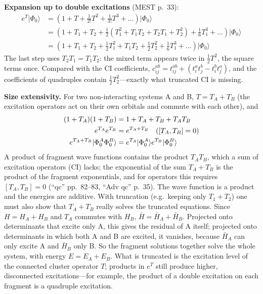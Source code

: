 \textbf{Expansion up to double excitations} (MEST p.~33):
\begin{align*}
e^{T} |\Phi_0\rangle &= \left(1 + T + \frac{1}{2!} T^2 + \frac{1}{3!} T^3 + \dots\right) |\Phi_0\rangle \\
&= \left(1 + T_1 + T_2 + \frac{1}{2} (T_1^2 + T_1 T_2 + T_2 T_1 + T_2^2) + \frac{1}{6} T_1^3 + \dots\right) |\Phi_0\rangle \\
&= \left(1 + T_1 + T_2 + \frac{1}{2} T_1^2 + T_1 T_2 + \frac{1}{2} T_2^2 + \frac{1}{6} T_1^3 + \dots\right) |\Phi_0\rangle
\end{align*}
The last step uses $T_2 T_1 = T_1 T_2$: the mixed term appears twice in $\frac{1}{2} T^2$, the square terms once.
Compared with the CI coefficients, $c_{ij}^{ab} = t_{ij}^{ab} + (t_i^a t_j^b - t_i^b t_j^a)$, and the coefficients of quadruples contain $\frac{1}{2} T_2^2$---exactly what truncated CI is missing.

\textbf{Size extensivity.} For two non-interacting systems A and B, $T = T_A + T_B$ (the excitation operators act on their own orbitals and commute with each other), and
\begin{align*}
(1 + T_A)(1 + T_B) &= 1 + T_A + T_B + T_A T_B \\
e^{T_A} e^{T_B} &= e^{T_A + T_B} \quad\text{($[T_A, T_B] = 0$)} \\
e^{T_A + T_B} |\Phi_0^A \Phi_0^B\rangle &= e^{T_A} |\Phi_0^A\rangle e^{T_B} |\Phi_0^B\rangle
\end{align*}
A product of fragment wave functions contains the product $T_A T_B$, which a sum of excitation operators (CI) lacks; the exponential of the sum $T_A + T_B$ is the product of the fragment exponentials, and for operators this requires $[T_A, T_B] = 0$ (“qc” pp.~82--83, “Adv qc” p.~35).
The wave function is a product and the energies are additive. With truncation (e.g.\ keeping only $T_1 + T_2$) one must also show that $T_A + T_B$ really solves the truncated equations. Since $H = H_A + H_B$ and $T_A$ commutes with $H_B$, $\bar{H} = \bar{H}_A + \bar{H}_B$. Projected onto determinants that excite only A, this gives the residual of A itself; projected onto determinants in which both A and B are excited, it vanishes, because $\bar{H}_A$ can only excite A and $\bar{H}_B$ only B. So the fragment solutions together solve the whole system, with energy $E = E_A + E_B$. What is truncated is the excitation level of the connected cluster operator $T$; products in $e^{T}$ still produce higher, disconnected excitations---for example, the product of a double excitation on each fragment is a quadruple excitation.

